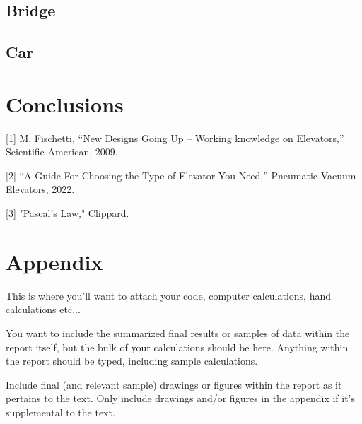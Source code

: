 \documentclass[fleqn,12pt]{project}
\begin{document}
\subsection{Bridge}
\subsection{Car}
\section{Conclusions}


\newpage

{
[1] M. Fischetti, “New Designs Going Up – Working knowledge on Elevators,” Scientific American, 2009.

[2] “A Guide For Choosing the Type of Elevator You Need,” Pneumatic Vacuum Elevators, 2022.

[3] "Pascal's Law," Clippard. 

}
\newpage
\section*{Appendix}

This is where you'll want to attach your code, computer calculations, hand calculations etc...

You want to include the summarized final results or samples of data within the report itself, but the bulk of your calculations should be here. Anything within the report should be typed, including sample calculations.

Include final (and relevant sample) drawings or figures within the report as it pertains to the text. Only include drawings and/or figures in the appendix if it's supplemental to the text. 
\end{document}
